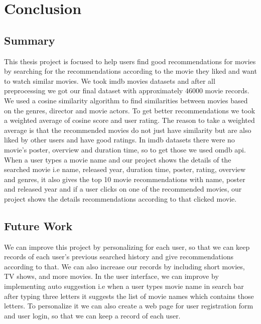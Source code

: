 \chapter{Conclusion}
\label{ch:conclusion}

\section{Summary}

This thesis project is focused to help users find good recommendations for movies by searching for the recommendations according to the movie they liked and want to watch similar movies. We took imdb movies datasets and after all preprocessing we got our final dataset with approximately 46000 movie records. We used a cosine similarity algorithm to find similarities between movies based on the genres, director and movie actors. To get better recommendations we took a weighted average of cosine score and user rating. The reason to take a weighted average is that the recommended movies do not just have similarity but are also liked by other users and have good ratings. In imdb datasets there were no movie’s poster, overview and duration time, so to get those we used omdb api. When a user types a movie name and our project shows the details of the searched movie i.e name, released year, duration time, poster, rating, overview and genres, it also gives the top 10 movie recommendations with name, poster and released year and if a user clicks on one of the recommended movies, our project shows the details recommendations according to that clicked movie.

\section{Future Work}

We can improve this project by personalizing for each user, so that we can keep records of each user’s previous searched history and give recommendations according to that. We can also increase our records by including short movies, TV shows, and more movies. In the user interface, we can improve by implementing auto suggestion i.e when a user types movie name in search bar after typing three letters it suggests the list of movie names which contains those letters. To personalize it we can also create a web page for user registration form and user login, so that we can keep a record of each user.